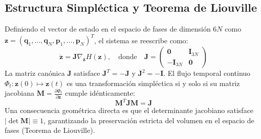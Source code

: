 \documentclass[11pt,a4paper]{article}
\begin{document}
\subsection{Estructura Simpléctica y Teorema de Liouville}
Definiendo el vector de estado en el espacio de fases de dimensión $6N$ como $\mathbf{z} = (\mathbf{q}_1, \dots, \mathbf{q}_N, \mathbf{p}_1, \dots, \mathbf{p}_N)^T$, el sistema se reescribe como:
\begin{equation}
    \dot{\mathbf{z}} = \mathbf{J} \nabla_{\mathbf{z}} H(\mathbf{z}), \quad \text{donde} \quad \mathbf{J} = \begin{pmatrix} \mathbf{0} & \mathbf{I}_{3N} \\ -\mathbf{I}_{3N} & \mathbf{0} \end{pmatrix}
\end{equation}
La matriz canónica $\mathbf{J}$ satisface $\mathbf{J}^T = -\mathbf{J}$ y $\mathbf{J}^2 = -\mathbf{I}$. El flujo temporal continuo $\Phi_t: \mathbf{z}(0) \mapsto \mathbf{z}(t)$ es una transformación simpléctica si y solo si su matriz jacobiana $\mathbf{M} = \frac{\partial \Phi_t}{\partial \mathbf{z}}$ cumple idénticamente:
\begin{equation}
    \mathbf{M}^T \mathbf{J} \mathbf{M} = \mathbf{J}
    \label{eq:symplectic_condition}
\end{equation}
Una consecuencia geométrica directa es que el determinante jacobiano satisface $|\det \mathbf{M}| \equiv 1$, garantizando la preservación estricta del volumen en el espacio de fases (Teorema de Liouville).
\end{document}
